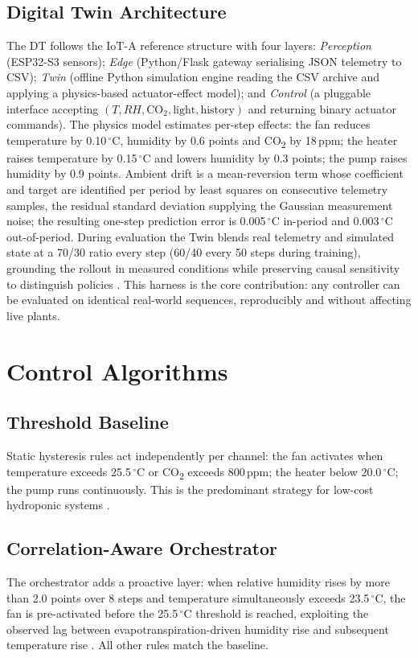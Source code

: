 \documentclass[conference]{IEEEtran}
\begin{document}
\subsection{Digital Twin Architecture}
The DT follows the IoT-A reference structure \cite{verdouw2021} with four layers:
\textit{Perception} (ESP32-S3 sensors); \textit{Edge} (Python/Flask gateway
serialising JSON telemetry to CSV); \textit{Twin} (offline Python simulation
engine reading the CSV archive and applying a physics-based actuator-effect
model); and \textit{Control} (a pluggable interface accepting
$(T,\mathit{RH},\mathrm{CO_2},\text{light},\text{history})$ and returning binary
actuator commands). The physics model estimates per-step effects: the fan reduces
temperature by 0.10\,$^{\circ}$C, humidity by 0.6 points and
CO\textsubscript{2} by 18\,ppm; the heater raises temperature by
0.15\,$^{\circ}$C and lowers humidity by 0.3 points; the pump raises humidity by
0.9 points. Ambient drift is a mean-reversion term whose coefficient and target
are identified per period by least squares on consecutive telemetry samples, the
residual standard deviation supplying the Gaussian measurement noise; the
resulting one-step prediction error is 0.005\,$^{\circ}$C in-period and
0.003\,$^{\circ}$C out-of-period. During evaluation the Twin blends real
telemetry and simulated state at a 70/30 ratio every step (60/40 every 50 steps
during training), grounding the rollout in measured conditions while preserving
causal sensitivity to distinguish policies \cite{luo2025}. This harness is the
core contribution: any controller can be evaluated on identical real-world
sequences, reproducibly and without affecting live plants.

\section{Control Algorithms}

\subsection{Threshold Baseline}
Static hysteresis rules act independently per channel: the fan activates when
temperature exceeds 25.5\,$^{\circ}$C or CO\textsubscript{2} exceeds 800\,ppm;
the heater below 20.0\,$^{\circ}$C; the pump runs continuously. This is the
predominant strategy for low-cost hydroponic systems
\cite{sneineh2023,rofiansyah2025}.

\subsection{Correlation-Aware Orchestrator}
The orchestrator adds a proactive layer: when relative humidity rises by more
than 2.0 points over 8 steps and temperature simultaneously exceeds
23.5\,$^{\circ}$C, the fan is pre-activated before the 25.5\,$^{\circ}$C
threshold is reached, exploiting the observed lag between
evapotranspiration-driven humidity rise and subsequent temperature rise
\cite{bakirov2025,ferentinos2017}. All other rules match the baseline.
\end{document}
